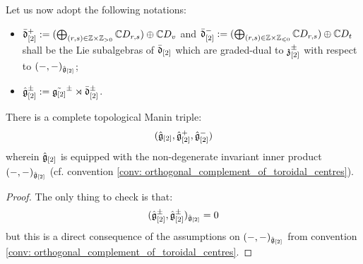             \begin{convention}
                Let us now adopt the following notations:
                \begin{itemize}
                    \item $\bar{\d}_{[2]}^+ := ( \bigoplus_{(r, s) \in \Z \x \Z_{> 0} } \bbC D_{r, s} ) \oplus \bbC D_v$ and $\bar{\d}_{[2]}^- := ( \bigoplus_{(r, s) \in \Z \x \Z_{\leq 0} } \bbC D_{r, s} ) \oplus \bbC D_t$ shall be the Lie subalgebras of $\bar{\mathfrak{d}}_{[2]}$ which are graded-dual to $\mathfrak{z}_{[2]}^{\pm}$ with respect to $(-, -)_{\hat{\mathfrak{g}}_{[2]}}$;
                    \item $\hat{\mathfrak{g}}_{[2]}^{\pm} := \tilde{ \mathfrak{g}_{[2]} }^{\pm} \rtimes \bar{\mathfrak{d}}_{[2]}^{\pm}$.
                \end{itemize}
            \end{convention}    
            \begin{theorem} \label{theorem: extended_toroidal_manin_triples}
                There is a complete topological Manin triple:
                    $$(\hat{\mathfrak{g}}_{[2]}, \hat{\mathfrak{g}}_{[2]}^+, \hat{\mathfrak{g}}_{[2]}^-)$$
                wherein $\hat{\mathfrak{g}}_{[2]}$ is equipped with the non-degenerate invariant inner product $(-, -)_{\hat{\mathfrak{g}}_{[2]}}$ (cf. convention \ref{conv: orthogonal_complement_of_toroidal_centres}).
            \end{theorem}
                \begin{proof}
                    The only thing to check is that:
                        $$(\hat{\mathfrak{g}}_{[2]}^{\pm}, \hat{\mathfrak{g}}_{[2]}^{\pm})_{\hat{\mathfrak{g}}_{[2]}} = 0$$
                    but this is a direct consequence of the assumptions on $(-, -)_{\hat{\mathfrak{g}}_{[2]}}$ from convention \ref{conv: orthogonal_complement_of_toroidal_centres}. 
                \end{proof}
